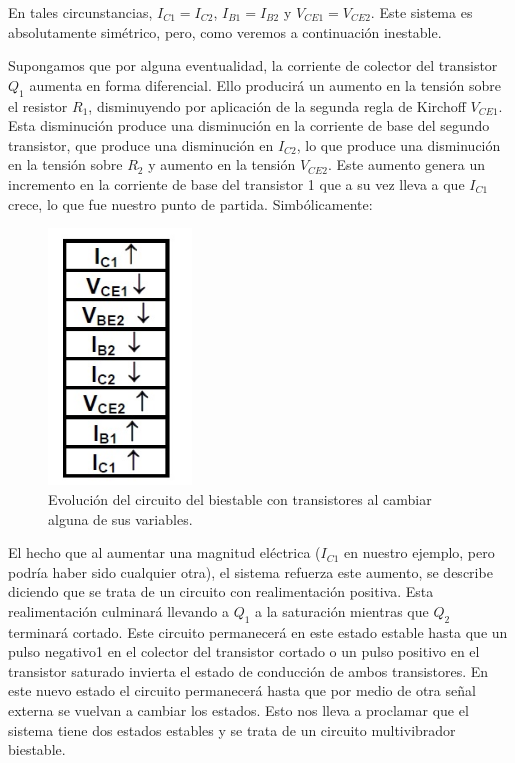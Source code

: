 \documentclass[12pt]{book}
\theoremstyle{definition}
\theoremstyle{remark}
\theoremstyle{plain}
\begin{document}
En tales circunstancias, $I_{C1} = I_{C2}$, $I_{B1} = I_{B2}$ y $V_{CE1} = V_{CE2}$.
Este sistema es absolutamente simétrico, pero, como veremos a continuación inestable.

Supongamos que por alguna eventualidad, la corriente de colector del transistor $Q_{1}$ aumenta en forma diferencial. Ello producirá un aumento en la tensión sobre el resistor $R_1$, disminuyendo por aplicación de la segunda regla de Kirchoff $V_{CE1}$. Esta disminución produce una disminución en la corriente de base del segundo transistor, que produce una disminución en $I_{C2}$, lo que produce una disminución en la tensión sobre $R_2$ y aumento en la tensión $V_{CE2}$. Este aumento genera un incremento en la corriente de base del transistor 1 que a su vez lleva a que $I_{C1}$ crece, lo que fue nuestro punto de partida. Simbólicamente:

\begin{figure}
\centering
\includegraphics[width=1.5in]{biestable2.jpg}
\caption{Evolución del circuito del biestable con transistores al cambiar alguna de sus variables.}
\label{fig6}
\end{figure}

El hecho que al aumentar una magnitud eléctrica ($I_{C1}$ en nuestro ejemplo, pero podría haber sido cualquier otra), el sistema refuerza este aumento, se describe diciendo que se trata de un circuito con realimentación positiva.
Esta realimentación culminará llevando a $Q_1$ a la saturación mientras que $Q_2$ terminará cortado.
Este circuito permanecerá en este estado estable hasta que un pulso negativo1 en el colector del transistor cortado o un pulso positivo en el transistor saturado invierta el estado de conducción de ambos transistores. En este nuevo estado el circuito permanecerá hasta que por medio de otra señal externa se vuelvan a cambiar los estados.
Esto nos lleva a proclamar que el sistema tiene dos estados estables y se trata de un circuito multivibrador biestable.
\end{document}

